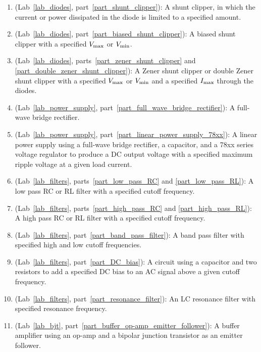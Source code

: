 \begin{flushleft}
\begin{enumerate}[align=left,leftmargin=*]
\item (Lab~\ref{lab_diodes}, part~\ref{part_shunt_clipper}): A shunt clipper, in which the current or power dissipated in the diode is limited to a specified amount.

\item (Lab~\ref{lab_diodes}, part~\ref{part_biased_shunt_clipper}): A biased shunt clipper with a specified $V_{\rm max}$ or $V_{\rm min}$.

\item (Lab~\ref{lab_diodes}, parts~\ref{part_zener_shunt_clipper} and \ref{part_double_zener_shunt_clipper}): A Zener shunt clipper or double Zener shunt clipper with a specified $V_{\rm max}$ or $V_{\rm min}$ and a specified $I_{\rm max}$ through the diodes.

\item (Lab~\ref{lab_power_supply}, part~\ref{part_full_wave_bridge_rectifier}): A full-wave bridge rectifier.

\item (Lab~\ref{lab_power_supply}, part~\ref{part_linear_power_supply_78xx}): A linear power supply using a full-wave bridge rectifier, a capacitor, and a 78xx series voltage regulator to produce a DC output voltage with a specified maximum ripple voltage at a given load current.

\item (Lab~\ref{lab_filters}, parts~\ref{part_low_pass_RC} and \ref{part_low_pass_RL}): A low pass RC or RL filter with a specified cutoff frequency.

\item (Lab~\ref{lab_filters}, parts~\ref{part_high_pass_RC} and \ref{part_high_pass_RL}): A high  pass RC or RL filter with a specified cutoff frequency.

\item (Lab~\ref{lab_filters}, part~\ref{part_band_pass_filter}): A band pass filter with specified high and low cutoff frequencies.

\item (Lab~\ref{lab_filters}, part~\ref{part_DC_bias}): A circuit using a capacitor and two resistors to add a specified DC bias to an AC signal above a given cutoff frequency.

\item (Lab~\ref{lab_filters}, part~\ref{part_resonance_filter}): An LC resonance  filter with specified resonance frequency.

\item (Lab~\ref{lab_bjt}, part~\ref{part_buffer_op-amp_emitter_follower}): A buffer amplifier using an op-amp and a bipolar junction transistor as an emitter follower.


\end{enumerate}
\end{flushleft}
